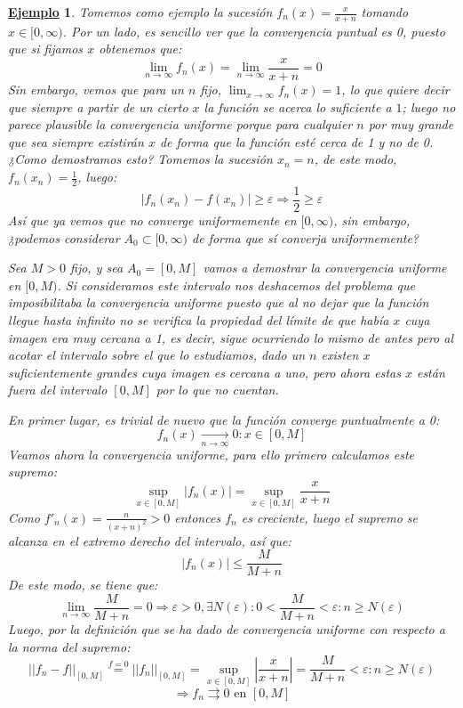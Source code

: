 \documentclass[10pt,a4paper,openright]{book}
\theoremstyle{break}
\newtheorem{ej}{\underline{Ejemplo}}[chapter]
\begin{document}
\begin{ej}
Tomemos como ejemplo la sucesión $f_n(x) = \frac{x}{x+n}$ tomando $x\in [0,\infty)$. Por un lado, es sencillo ver que la convergencia puntual es 0, puesto que si fijamos $x$ obtenemos que:
$$\lim_{n \rightarrow \infty} f_n(x) =\lim_{n \rightarrow \infty} \frac{x}{x+n} = 0$$
Sin embargo, vemos que para un $n$ fijo, $\lim_{x \rightarrow \infty} f_n(x) = 1$, lo que quiere decir que siempre a partir de un cierto $x$ la función se acerca lo suficiente a $1$; luego no parece plausible la convergencia uniforme porque para cualquier $n$ por muy grande que sea siempre existirán $x$ de forma que la función esté cerca de 1 y no de 0. ¿Como demostramos esto? Tomemos la sucesión $x_n = n$, de este modo, $f_n(x_n) = \frac{1}{2}$, luego:
$$|f_n(x_n)-f(x_n)|\geq \varepsilon\Rightarrow \frac{1}{2} \geq \varepsilon$$
Así que ya vemos que no converge uniformemente en $[0,\infty)$, sin embargo, ¿podemos considerar $A_0\subset [0,\infty)$ de forma que sí converja uniformemente?

Sea $M > 0$ fijo, y sea $A_0 = [0,M]$ vamos a demostrar la convergencia uniforme en $[0,M)$. Si consideramos este intervalo nos deshacemos del problema que imposibilitaba la convergencia uniforme puesto que al no dejar que la función llegue hasta infinito no se verifica la propiedad del límite de que había $x$ cuya imagen era muy cercana a 1, es decir, sigue ocurriendo lo mismo de antes pero al acotar el intervalo sobre el que lo estudiamos, dado un $n$ existen $x$ suficientemente grandes cuya imagen es cercana a uno, pero ahora estas $x$ están fuera del intervalo $[0,M]$ por lo que no cuentan.

En primer lugar, es trivial de nuevo que la función converge puntualmente a 0:
$$f_n (x)\underset{n \to \infty}{\longrightarrow} 0 : x \in [0,M]$$
Veamos ahora la convergencia uniforme, para ello primero calculamos este supremo:
$$\underset{x \in [0,M]}{\sup} |f_n(x)| = \underset{x \in [0,M]}{\sup} \frac{x}{x+n}$$
Como $f'_n (x) = \frac{n}{(x+n)^2} > 0$ entonces $f_n $ es creciente, luego el supremo se alcanza en el extremo derecho del intervalo, así que:
$$|f_n (x)| \leq \frac{M}{M + n}$$
De este modo, se tiene que:
$$\lim_{n \to \infty} \frac{M}{M + n} = 0 \Rightarrow \varepsilon > 0, \exists N (\varepsilon) : 0 < \frac{M}{M + n} < \varepsilon: n \geq N(\varepsilon)$$
Luego, por la definición que se ha dado de convergencia uniforme con respecto a la norma del supremo:
$$||f_n - f||_{[0,M]} \stackrel{f=0}{=} ||f_n||_{[0,M]} = \underset{x \in [0,M]}{\sup} \left| \frac{x}{x+n} \right|= \frac{M}{M+n} < \varepsilon : n \geq N(\varepsilon)$$
$$\Rightarrow f_n \rightrightarrows 0 \mbox{ en } [0,M]$$
\end{ej}
\end{document}
